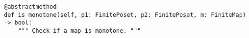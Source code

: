 \begin{verbatim}
@abstractmethod
def is_monotone(self, p1: FinitePoset, p2: FinitePoset, m: FiniteMap) -> bool:
    """ Check if a map is monotone. """
\end{verbatim}
